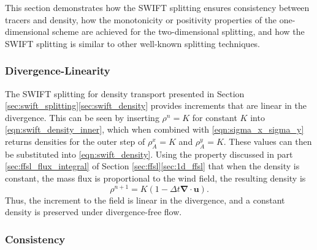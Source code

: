 \documentclass{ametsocV6.1}
\begin{document}
This section demonstrates how the SWIFT splitting ensures consistency between tracers and density, how the monotonicity or positivity properties of the one-dimensional scheme are achieved for the two-dimensional splitting, and how the SWIFT splitting is similar to other well-known splitting techniques. 

\subsubsection{Divergence-Linearity}
The SWIFT splitting for density transport presented in Section \ref{sec:swift_splitting}\ref{sec:swift_density}
provides increments that are linear in the divergence.
This can be seen by inserting $\rho^n=K$ for constant $K$ into \eqref{eqn:swift_density_inner}, which when combined with \eqref{eqn:sigma_x_sigma_y} returns densities for the outer step of $\rho_A^x=K$ and $\rho_A^y=K$.
These values can then be substituted into \eqref{eqn:swift_density}.
Using the property discussed in part \ref{sec:ffsl_flux_integral} of Section \ref{sec:ffsl}\ref{sec:1d_ffsl} that when the density is constant, the mass flux is proportional to the wind field, the resulting density is
\begin{equation}
\rho^{n+1} = K(1-\Delta t \bm{\nabla\cdot u}).
\end{equation}
Thus, the increment to the field is linear in the divergence, and a constant density is preserved under divergence-free flow.

\subsubsection{Consistency}
\end{document}
